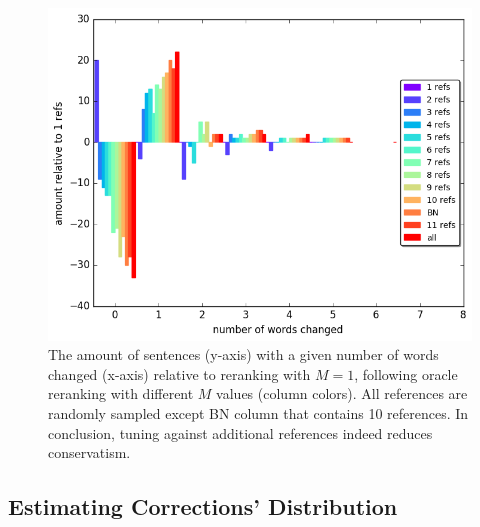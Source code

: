 \documentclass[letterpaper, 11pt]{article}
\begin{document}
\begin{figure}
	\vspace{-1em}
	\includegraphics[width=0.9\columnwidth]{words_relative_differences_hist_reranking}
	\caption{The amount of sentences (y-axis) with a given number of words changed (x-axis) relative to reranking with $M=1$, following oracle reranking with different $M$ values (column colors). All references are randomly sampled except BN column that contains  10 references.
		In conclusion, tuning against additional references indeed reduces conservatism.
		\label{fig:reranking_word_change}
        }
	\vspace{-0.5cm}
\end{figure}
%
\subsection{Estimating Corrections' Distribution}\label{subsec:corrections_distribution}
%
\end{document}
